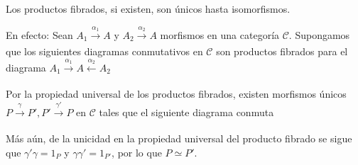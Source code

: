 \documentclass[tesis]{subfiles}
\begin{document}
\begin{Obs} \label{Mendoza-Ejer.7}
    Los productos fibrados, si existen, son únicos hasta isomorfismos.
    \vspace{1mm}

    En efecto: Sean $A_1\xrightarrow[]{\alpha_1}A$ y $A_2\xrightarrow[]{\alpha_2}A$ morfismos en una categoría $\mathscr{C}$. Supongamos que los siguientes diagramas conmutativos en $\mathscr{C}$ son productos fibrados para el diagrama $A_1\xrightarrow[]{\alpha_1}A\xleftarrow[]{\alpha_2}A_2$
    \begin{center}
    \end{center}
    Por la propiedad universal de los productos fibrados, existen morfismos únicos $P\xrightarrow[]{\gamma} P', P'\xrightarrow[]{\gamma'} P$ en $\mathscr{C}$ tales que el siguiente diagrama conmuta
    \begin{center}
    \end{center}
    Más aún, de la unicidad en la propiedad universal del producto fibrado se sigue que $\gamma'\gamma=1_P$ y $\gamma\gamma'=1_{P'}$, por lo que $P\simeq P'$.
\end{Obs}
\end{document}
